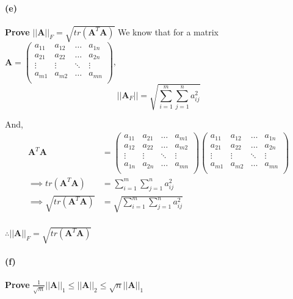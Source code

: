 \documentclass[12pt, letterpaper]{article}
\begin{document}
\paragraph{(e)} \textbf{Prove} $||\mathbf{A}||_F = \sqrt{tr(\mathbf{A}^T\mathbf{A})}$\newline
We know that for a matrix $\mathbf{A} =
\begin{pmatrix}
  a_{11} & a_{12} & \dots & a_{1n}\\
  a_{21} & a_{22} & \dots & a_{2n}\\
  \vdots & \vdots & \ddots & \vdots\\
  a_{m1} & a_{m2} & \dots & a_{mn}\\
\end{pmatrix}
$,
\begin{equation}\label{eq:4e}
||\mathbf{A}_F|| = \sqrt{\sum_{i=1}^m\sum_{j=1}^na_{ij}^2}
\end{equation}

And,
\begin{align*}
\label{eq:4e1}
\mathbf{A}^T\mathbf{A} &= 
\begin{pmatrix}
  a_{11} & a_{21} & \dots & a_{m1}\\
  a_{12} & a_{22} & \dots & a_{m2}\\
  \vdots & \vdots & \ddots & \vdots\\
  a_{1n} & a_{2n} & \dots & a_{mn}\\
\end{pmatrix}
\begin{pmatrix}
  a_{11} & a_{12} & \dots & a_{1n}\\
  a_{21} & a_{22} & \dots & a_{2n}\\
  \vdots & \vdots & \ddots & \vdots\\
  a_{m1} & a_{m2} & \dots & a_{mn}\\
\end{pmatrix}\\
\implies tr(\mathbf{A}^T\mathbf{A}) &= \sum_{i=1}^m\sum_{j=1}^na_{ij}^2\\
\implies \sqrt{tr(\mathbf{A}^T\mathbf{A})} &= \sqrt{\sum_{i=1}^m\sum_{j=1}^na_{ij}^2}\\
\end{align*}

$\therefore \boxed{||\mathbf{A}||_F = \sqrt{tr(\mathbf{A}^T\mathbf{A})}}$


\paragraph{(f)} \textbf{Prove} $\frac{1}{\sqrt{m}}||\mathbf{A}||_1 \leq ||\mathbf{A}||_2 \leq \sqrt{n}||\mathbf{A}||_1$
\end{document}
